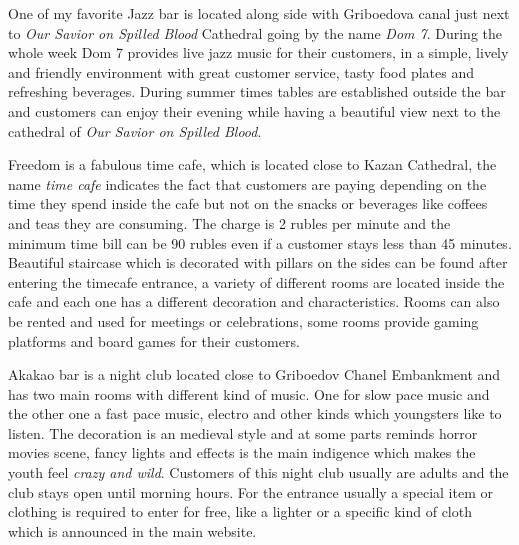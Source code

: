 \documentclass[10pt,a4paper]{article} %
\begin{document}
\begin{multicols}{3}
One of my favorite Jazz bar is located along side with Griboedova canal just next 
to \textit{Our Savior on Spilled Blood} Cathedral going by the name \textit{Dom 7}. 
During the whole week Dom 7 provides live jazz music for their customers, 
in a simple, lively and friendly environment with great customer service, 
tasty food plates and refreshing beverages. 
During summer times tables are established outside the bar and customers 
can enjoy their evening while having a beautiful view next to the cathedral 
of \textit{Our Savior on Spilled Blood}.

Freedom is a fabulous time cafe, which is located close to Kazan Cathedral, 
the name \textit{time cafe} indicates the fact that customers are paying depending 
on the time they spend inside the cafe but not on the snacks or beverages 
like coffees and teas they are consuming. 
The charge is 2 rubles per minute and the minimum time bill can be 90 rubles even 
if a customer stays less than 45 minutes. 
Beautiful staircase which is decorated with pillars on the sides 
can be found after entering the timecafe entrance, a variety of different rooms 
are located inside the cafe and each one has a different decoration and characteristics. 
Rooms can also be rented and used for meetings or celebrations, 
some rooms provide gaming platforms and board games for their customers.

Akakao bar is a night club located close to Griboedov Chanel Embankment 
and has two main rooms with different kind of music. 
One for slow pace music and the other one a fast pace music, 
electro and other kinds which youngsters like to listen. 
The decoration is an medieval style and at some parts reminds horror movies scene, 
fancy lights and effects is the main indigence which makes the youth feel 
\textit{crazy and wild}. 
Customers of this night club usually are adults and the club stays open until morning hours. 
For the entrance usually a special item or clothing is required to enter for free, 
like a lighter or a specific kind of cloth which is announced in the main website.


\end{multicols}
\end{document}
